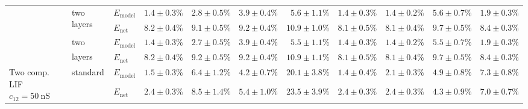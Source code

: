 \begin{sidewaystable}
\begin{tabular}{p{2.2cm} p{1.7cm} l r r r r r r r r }
	\\\cmidrule(l){2-11}
	&
	\multirow{2}{1.7cm}{\raggedleft two layers} &
	$E_\mathrm{model}$ & 
	\color{Gray}$1.4 \pm 0.3\%$ & \color{Gray}$2.8 \pm 0.5\%$ & \color{Gray}$3.9 \pm 0.4\%$ & \color{Gray}$5.6 \pm 1.1\%$ & \color{Gray}$1.4 \pm 0.3\%$ & \color{Gray}$1.4 \pm 0.2\%$ & \color{Gray}$5.6 \pm 0.7\%$ & \color{Gray}$1.9 \pm 0.3\%$
	\\
	& & 
	$E_\mathrm{net}$ &
	\cellcolor{White!19!SteelBlue}$8.2 \pm 0.4\%$ & \cellcolor{White!75!SteelBlue}$9.1 \pm 0.5\%$ & \cellcolor{White!38!SteelBlue}$9.2 \pm 0.4\%$ & \cellcolor{White!94!SteelBlue}$10.9 \pm 1.0\%$ & \cellcolor{White!32!SteelBlue}$8.1 \pm 0.5\%$ & \cellcolor{White!38!SteelBlue}$8.1 \pm 0.4\%$ & \cellcolor{White!32!SteelBlue}$9.7 \pm 0.5\%$ & \cellcolor{White!69!SteelBlue}$8.4 \pm 0.3\%$
	\\\cmidrule(l){2-11}
	&
	\multirow{2}{1.7cm}{\raggedleft two layers\textsuperscript{\dag}} &
	$E_\mathrm{model}$ & 
	\color{Gray}$1.4 \pm 0.3\%$ & \color{Gray}$\mathbf{2.7 \pm 0.5\%}$ & \color{Gray}$3.9 \pm 0.4\%$ & \color{Gray}$\mathbf{5.5 \pm 1.1\%}$ & \color{Gray}$1.4 \pm 0.3\%$ & \color{Gray}$\mathbf{1.4 \pm 0.2\%}$ & \color{Gray}$5.5 \pm 0.7\%$ & \color{Gray}$\mathbf{1.9 \pm 0.3\%}$
	\\
	& & 
	$E_\mathrm{net}$ &
	\cellcolor{White!25!SteelBlue}$8.2 \pm 0.4\%$ & \cellcolor{White!69!SteelBlue}$9.2 \pm 0.5\%$ & \cellcolor{White!32!SteelBlue}$9.2 \pm 0.4\%$ & \cellcolor{White!100!SteelBlue}$\mathbf{10.9 \pm 1.1\%}$ & \cellcolor{White!38!SteelBlue}$8.1 \pm 0.5\%$ & \cellcolor{White!32!SteelBlue}$8.1 \pm 0.4\%$ & \cellcolor{White!38!SteelBlue}$9.7 \pm 0.5\%$ & \cellcolor{White!75!SteelBlue}$8.4 \pm 0.3\%$
	\\\midrule
	\multirow{8}{2.2cm}{\raggedleft %
	Two comp. LIF $c_{12} = \SI{50}{\nano\siemens}$} &
	\multirow{2}{1.7cm}{\raggedleft %
	standard} &
	$E_\mathrm{model}$ & 
	\color{Gray}$1.5 \pm 0.3\%$ & \color{Gray}$6.4 \pm 1.2\%$ & \color{Gray}$4.2 \pm 0.7\%$ & \color{Gray}$20.1 \pm 3.8\%$ & \color{Gray}$1.4 \pm 0.4\%$ & \color{Gray}$2.1 \pm 0.3\%$ & \color{Gray}$4.9 \pm 0.8\%$ & \color{Gray}$7.3 \pm 0.8\%$
	\\
	& & 
	$E_\mathrm{net}$ &
	\cellcolor{White!94!SteelBlue}$2.4 \pm 0.3\%$ & \cellcolor{White!82!SteelBlue}$8.5 \pm 1.4\%$ & \cellcolor{White!94!SteelBlue}$5.4 \pm 1.0\%$ & \cellcolor{White!44!SteelBlue}$23.5 \pm 3.9\%$ & \cellcolor{White!94!SteelBlue}$2.4 \pm 0.3\%$ & \cellcolor{White!94!SteelBlue}$2.4 \pm 0.3\%$ & \cellcolor{White!94!SteelBlue}$4.3 \pm 0.9\%$ & \cellcolor{White!82!SteelBlue}$7.0 \pm 0.7\%$

\end{tabular}
\end{sidewaystable}

